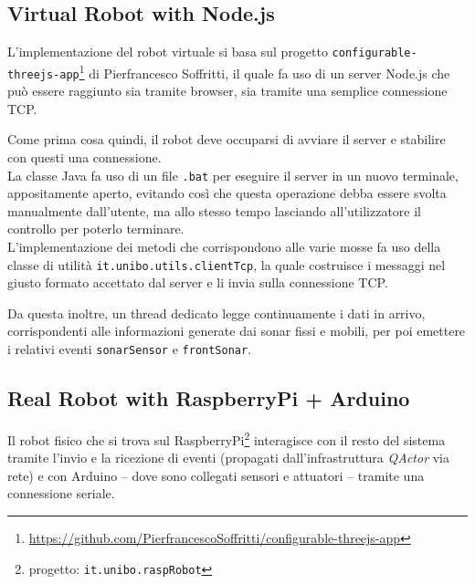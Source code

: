 \documentclass{../llncs}
\newcommand{\codescript}[1]{{\mbox{\small{\texttt{#1}}}}\xspace}
\newcommand{\qa}{\textsf{\textit{QActor}}\xspace}
\newcommand{\labelssec}[1]{\label{ssec:#1}}
\begin{document}


\subsection{Virtual Robot with Node.js}
\labelssec{robotNodeImpl}
L'implementazione del robot virtuale si basa sul progetto \texttt{configurable-threejs-app}\footnote{\url{https://github.com/PierfrancescoSoffritti/configurable-threejs-app}} di Pierfrancesco Soffritti, il quale fa uso di un server Node.js che può essere raggiunto sia tramite browser, sia tramite una semplice connessione TCP.

Come prima cosa quindi, il robot deve occuparsi di avviare il server e stabilire con questi una connessione.\\



La classe Java fa uso di un file \texttt{.bat} per eseguire il server in un nuovo terminale, appositamente aperto, evitando così che questa operazione debba essere svolta manualmente dall'utente, ma allo stesso tempo lasciando all'utilizzatore il controllo per poterlo terminare.\\



L'implementazione dei metodi che corrispondono alle varie mosse fa uso della classe di utilità \codescript{it.unibo.utils.clientTcp}, la quale costruisce i messaggi nel giusto formato accettato dal server e li invia sulla connessione TCP.

Da questa inoltre, un thread dedicato legge continuamente i dati in arrivo, corrispondenti alle informazioni generate dai sonar fissi e mobili, per poi emettere i relativi eventi \codescript{sonarSensor} e \codescript{frontSonar}.

\subsection{Real Robot with RaspberryPi + Arduino}
\labelssec{realRobotRaspImpl}
Il robot fisico che si trova sul RaspberryPi\footnote{progetto: \texttt{it.unibo.raspRobot}} interagisce con il resto del sistema tramite l'invio e la ricezione di eventi (propagati dall'infrastruttura \qa via rete) e con Arduino -- dove sono collegati sensori e attuatori -- tramite una connessione seriale.
\end{document}
